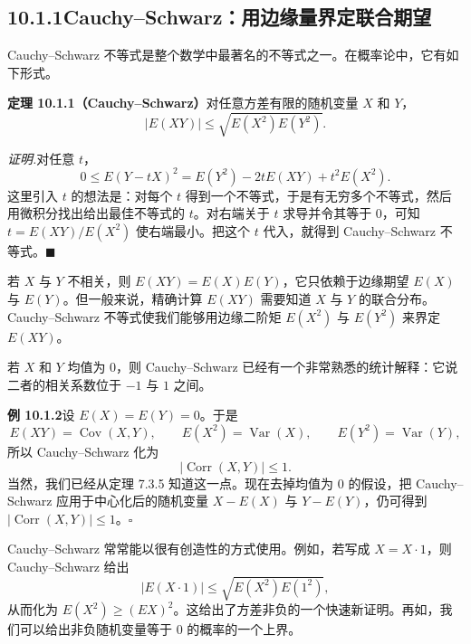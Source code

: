 \documentclass[UTF8,12pt,a4paper,fontset=fandol]{ctexart}
\begin{document}
\subsection*{10.1.1\quad Cauchy--Schwarz：用边缘量界定联合期望}

Cauchy--Schwarz 不等式是整个数学中最著名的不等式之一。在概率论中，它有如下形式。

\noindent\textbf{定理 10.1.1（Cauchy--Schwarz）}\quad 对任意方差有限的随机变量 $X$ 和 $Y$，
\[
  |E(XY)|\le \sqrt{E(X^2)E(Y^2)}.
\]

\noindent\textit{证明.}\quad 对任意 $t$，
\[
  0\le E(Y-tX)^2=E(Y^2)-2tE(XY)+t^2E(X^2).
\]
这里引入 $t$ 的想法是：对每个 $t$ 得到一个不等式，于是有无穷多个不等式，然后用微积分找出给出最佳不等式的 $t$。对右端关于 $t$ 求导并令其等于 $0$，可知 $t=E(XY)/E(X^2)$ 使右端最小。把这个 $t$ 代入，就得到 Cauchy--Schwarz 不等式。$\blacksquare$

若 $X$ 与 $Y$ 不相关，则 $E(XY)=E(X)E(Y)$，它只依赖于边缘期望 $E(X)$ 与 $E(Y)$。但一般来说，精确计算 $E(XY)$ 需要知道 $X$ 与 $Y$ 的联合分布。Cauchy--Schwarz 不等式使我们能够用边缘二阶矩 $E(X^2)$ 与 $E(Y^2)$ 来界定 $E(XY)$。

若 $X$ 和 $Y$ 均值为 $0$，则 Cauchy--Schwarz 已经有一个非常熟悉的统计解释：它说二者的相关系数位于 $-1$ 与 $1$ 之间。

\noindent\textbf{例 10.1.2}\quad 设 $E(X)=E(Y)=0$。于是
\[
  E(XY)=\operatorname{Cov}(X,Y),\qquad
  E(X^2)=\operatorname{Var}(X),\qquad
  E(Y^2)=\operatorname{Var}(Y),
\]
所以 Cauchy--Schwarz 化为
\[
  |\operatorname{Corr}(X,Y)|\le 1.
\]
当然，我们已经从定理 7.3.5 知道这一点。现在去掉均值为 $0$ 的假设，把 Cauchy--Schwarz 应用于中心化后的随机变量 $X-E(X)$ 与 $Y-E(Y)$，仍可得到 $|\operatorname{Corr}(X,Y)|\le 1$。$\square$

Cauchy--Schwarz 常常能以很有创造性的方式使用。例如，若写成 $X=X\cdot 1$，则 Cauchy--Schwarz 给出
\[
  |E(X\cdot 1)|\le \sqrt{E(X^2)E(1^2)},
\]
从而化为 $E(X^2)\ge (EX)^2$。这给出了方差非负的一个快速新证明。再如，我们可以给出非负随机变量等于 $0$ 的概率的一个上界。
\end{document}
